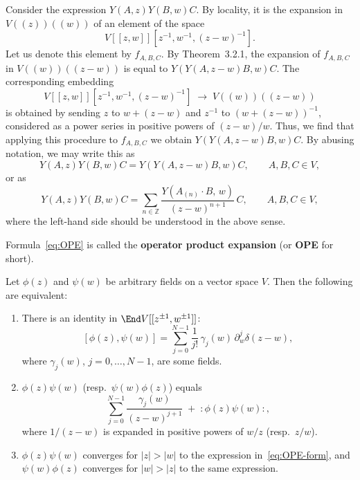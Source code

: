 \documentclass[12pt]{article}
\begin{document}
Consider the expression $Y(A,z)Y(B,w)C$.
By locality, it is the expansion in $V((z))((w))$ of an element of the space
\[
    V[[z,w]][z^{-1},w^{-1},(z-w)^{-1}].
\]
Let us denote this element by $f_{A,B,C}$.
By Theorem~3.2.1, the expansion of $f_{A,B,C}$ in $V((w))((z-w))$
is equal to $Y(Y(A,z-w)B,w)C$.
The corresponding embedding
\[
    V[[z,w]][z^{-1},w^{-1},(z-w)^{-1}] \;\to\; V((w))((z-w))
\]
is obtained by sending $z$ to $w+(z-w)$ and $z^{-1}$ to $(w+(z-w))^{-1}$,
considered as a power series in positive powers of $(z-w)/w$.
Thus, we find that applying this procedure to $f_{A,B,C}$
we obtain $Y(Y(A,z-w)B,w)C$.
By abusing notation, we may write this as
\[
    Y(A,z)Y(B,w)C = Y(Y(A,z-w)B,w)C, \qquad A,B,C\in V,
\]
or as
\begin{equation}
    \label{eq:OPE}
    Y(A,z)Y(B,w)C =
    \sum_{n\in\mathbb{Z}} \frac{Y(A_{(n)}\cdot B,\,w)}{(z-w)^{n+1}}\,C,
    \qquad A,B,C\in V,
\end{equation}
where the left-hand side should be understood in the above sense.
\begin{definition}
    Formula~\eqref{eq:OPE} is called the \textbf{operator product expansion} (or \textbf{OPE} for short).
\end{definition}

\begin{proposition}
    Let $\phi(z)$ and $\psi(w)$ be arbitrary fields on a vector space $V$.
    Then the following are equivalent:
    \begin{enumerate}
        \item[(1)] There is an identity in $\End V[[z^{\pm1},w^{\pm1}]]$:
              \begin{equation}\label{eq:delta-commutator}
                  [\phi(z),\psi(w)]
                  = \sum_{j=0}^{N-1} \frac{1}{j!}\,\gamma_j(w)\,\partial_w^{j}\delta(z-w),
              \end{equation}
              where $\gamma_j(w)$, $j=0,\dots,N-1$, are some fields.
        \item[(2)] $\phi(z)\psi(w)$ (resp.\ $\psi(w)\phi(z)$) equals
              \begin{equation}\label{eq:OPE-form}
                  \sum_{j=0}^{N-1} \frac{\gamma_j(w)}{(z-w)^{j+1}}
                  \;+\;
                  :\phi(z)\psi(w):,
              \end{equation}
              where $1/(z-w)$ is expanded in positive powers of $w/z$
              (resp.\ $z/w$).
        \item[(3)] $\phi(z)\psi(w)$ converges for $|z|>|w|$ to the expression
              in~\eqref{eq:OPE-form}, and $\psi(w)\phi(z)$ converges for $|w|>|z|$
              to the same expression.
    \end{enumerate}
\end{proposition}
\end{document}
